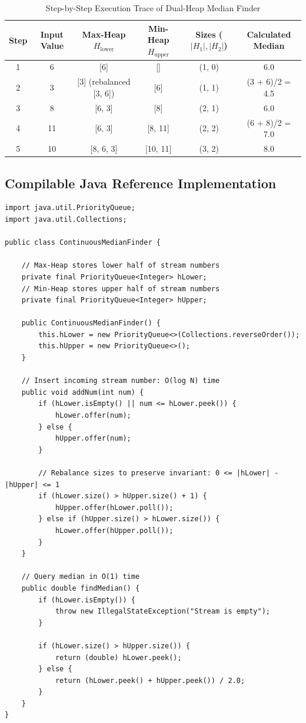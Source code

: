 \documentclass[10pt,journal,compsoc,onecolumn]{IEEEtran}
\begin{document}
\begin{table}[htbp]
\centering
\caption{Step-by-Step Execution Trace of Dual-Heap Median Finder}
\label{tab:median-trace}
\begin{tabular}{cccccc}
\toprule
\textbf{Step} & \textbf{Input Value} & \textbf{Max-Heap $H_{\text{lower}}$} & \textbf{Min-Heap $H_{\text{upper}}$} & \textbf{Sizes ($|H_1|, |H_2|$)} & \textbf{Calculated Median} \\
\midrule
1 & 6 & [6] & [] & (1, 0) & 6.0 \\
2 & 3 & [3] (rebalanced [3, 6]) & [6] & (1, 1) & (3 + 6)/2 = 4.5 \\
3 & 8 & [6, 3] & [8] & (2, 1) & 6.0 \\
4 & 11 & [6, 3] & [8, 11] & (2, 2) & (6 + 8)/2 = 7.0 \\
5 & 10 & [8, 6, 3] & [10, 11] & (3, 2) & 8.0 \\
\bottomrule
\end{tabular}
\end{table}

\subsection{Compilable Java Reference Implementation}

\begin{verbatim}
import java.util.PriorityQueue;
import java.util.Collections;

public class ContinuousMedianFinder {

    // Max-Heap stores lower half of stream numbers
    private final PriorityQueue<Integer> hLower;
    // Min-Heap stores upper half of stream numbers
    private final PriorityQueue<Integer> hUpper;

    public ContinuousMedianFinder() {
        this.hLower = new PriorityQueue<>(Collections.reverseOrder());
        this.hUpper = new PriorityQueue<>();
    }

    // Insert incoming stream number: O(log N) time
    public void addNum(int num) {
        if (hLower.isEmpty() || num <= hLower.peek()) {
            hLower.offer(num);
        } else {
            hUpper.offer(num);
        }

        // Rebalance sizes to preserve invariant: 0 <= |hLower| - |hUpper| <= 1
        if (hLower.size() > hUpper.size() + 1) {
            hUpper.offer(hLower.poll());
        } else if (hUpper.size() > hLower.size()) {
            hLower.offer(hUpper.poll());
        }
    }

    // Query median in O(1) time
    public double findMedian() {
        if (hLower.isEmpty()) {
            throw new IllegalStateException("Stream is empty");
        }

        if (hLower.size() > hUpper.size()) {
            return (double) hLower.peek();
        } else {
            return (hLower.peek() + hUpper.peek()) / 2.0;
        }
    }
}
\end{verbatim}
\end{document}
